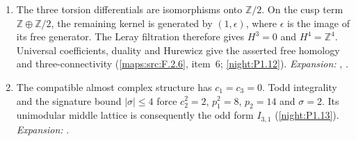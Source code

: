 \begin{enumerate}[label=\arabic*.,leftmargin=*]
\item\hypertarget{step-V-B-5}{} The three torsion differentials are isomorphisms onto
  $\mathbb Z/2$.  On the cusp term $\mathbb Z\oplus\mathbb Z/2$,
  the remaining kernel is generated by $(1,\epsilon)$, where
  $\epsilon$ is the image of its free generator.
  The Leray filtration therefore gives $H^3=0$ and
  $H^4=\mathbb Z^4$.  Universal coefficients, duality and
  Hurewicz give the asserted free homology and three-connectivity
  (\cref{maps:src:F.2.6}, item~6; \cref{night:P1.12}).
\textit{Expansion:} , .
\item\hypertarget{step-V-B-6}{} The compatible almost complex structure has $c_1=c_3=0$.
  Todd integrality and the signature bound $|\sigma|\leq4$ force
  $c_2^2=2$, $p_1^2=8$, $p_2=14$ and $\sigma=2$.
  Its unimodular middle lattice is consequently the odd form
  $I_{3,1}$ (\cref{night:P1.13}).
\textit{Expansion:} .
\end{enumerate}

\hypertarget{outline-V-C}{}
